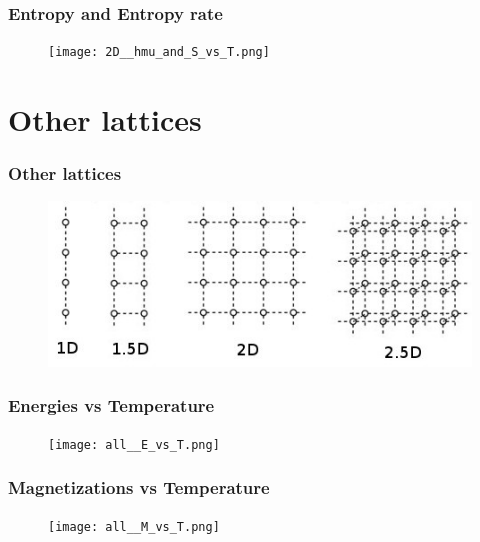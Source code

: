 \documentclass{beamer}
\begin{document}
\begin{frame}
\frametitle{Entropy and Entropy rate}

\begin{figure}
\texttt{[image: 2D\_\_hmu\_and\_S\_vs\_T.png]}
\end{figure}

\end{frame}

\section{Other lattices}

\begin{frame}
\frametitle{Other lattices}

\begin{figure}
\includegraphics[width=0.8\linewidth]{lattices.jpg}
\end{figure}

\end{frame}


\begin{frame}
\frametitle{Energies vs Temperature}

\begin{figure}
\texttt{[image: all\_\_E\_vs\_T.png]}
\end{figure}

\end{frame}


\begin{frame}
\frametitle{Magnetizations vs Temperature}

\begin{figure}
\texttt{[image: all\_\_M\_vs\_T.png]}
\end{figure}

\end{frame}
\end{document}
